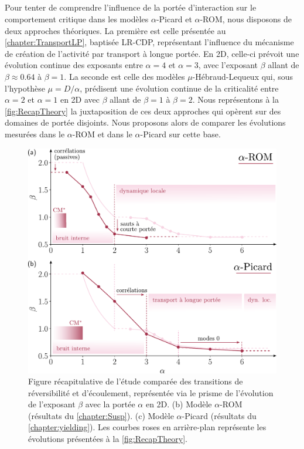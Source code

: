 \subparagraph{}Pour tenter de comprendre l'influence de la portée d'interaction sur le comportement critique dans les modèles $\alpha$-Picard et $\alpha$-ROM, nous disposons de deux approches théoriques. La première est celle présentée au \autoref{chapter:TransportLP}, baptisée LR-CDP, représentant l'influence du mécanisme de création de l'activité par transport à longue portée. En 2D, celle-ci prévoit une évolution continue des exposants entre $\alpha = 4$ et $\alpha = 3$, avec l'exposant $\beta$ allant de $\beta \approx 0.64$ à $\beta = 1$. La seconde est celle des modèles $\mu$-Hébraud-Lequeux qui, sous l'hypothèse $\mu = D/\alpha$, prédisent une évolution continue de la criticalité entre $\alpha=2$ et $\alpha = 1$ en 2D avec $\beta$ allant de $\beta = 1$ à $\beta = 2$. Nous représentons à la \autoref{fig:RecapTheory} la juxtaposition de ces deux approches qui opèrent sur des domaines de portée disjoints. Nous proposons alors de comparer les évolutions mesurées dans le $\alpha$-ROM et dans le $\alpha$-Picard sur cette base.

\begin{figure}[H]
	\centering
	\includegraphics[width=\textwidth]{Chapitre5/Figures/FigRecap.pdf}
	\caption{Figure récapitulative de l'étude comparée des transitions de réversibilité et d'écoulement, représentée via le prisme de l'évolution de l'exposant $\beta$ avec la portée $\alpha$ en 2D. (b) Modèle $\alpha$-ROM (résultats du \autoref{chapter:Susp}). (c) Modèle $\alpha$-Picard (résultats du \autoref{chapter:yielding}). Les courbes roses en arrière-plan représente les évolutions présentées à la \autoref{fig:RecapTheory}.}
	\label{fig:Recap}
\end{figure}


